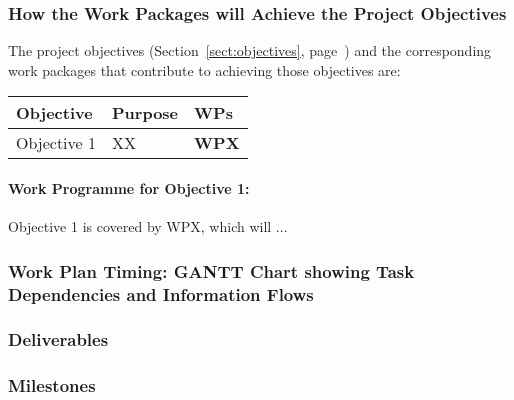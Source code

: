 \documentclass[noworkareas,deliverables,gitinfo,compactht]{euproposal}
\begin{document}
\begin{proposal}
\subsubsection*{How the Work Packages will Achieve the Project Objectives}
\label{sssec:how_the_work_packages_will_achieve}


The project objectives (Section~\ref{sect:objectives},
page~\pageref{sect:objectives}) and the corresponding work
packages that contribute to achieving those objectives are:

\begin{center}
\begin{tabular}{|l|l|l|}\hline
\textbf{Objective} & \textbf{Purpose} & \textbf{WPs} \\\hline \hline
Objective 1 & XX & \textbf{WPX} \\\hline
\end{tabular}
\end{center}

\paragraph*{Work Programme for Objective 1: }

Objective 1 is covered by WPX, which will ...

\subsubsection*{Work Plan Timing: GANTT Chart showing Task Dependencies and Information Flows}

\ganttchart[draft,xscale=.28] 
\newpage

\wpfigstyle{\footnotesize\def\tabcolsep{3.5pt}}
{\wpfig}

\newpage
\subsubsection*{Deliverables}\label{sec:deliverables}
\newpage
\subsubsection*{Milestones}\label{sec:milestones}




\end{proposal}
\end{document}
